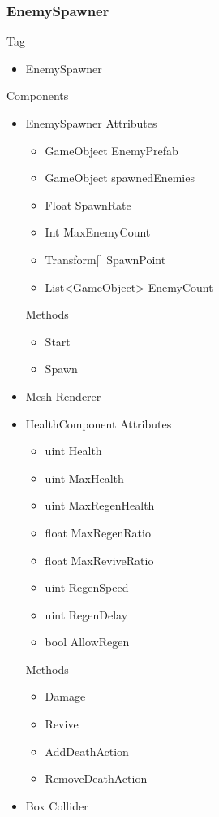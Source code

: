 \documentclass[11pt]{article}
\begin{document}
\subsubsection{EnemySpawner}
Tag
\begin{itemize}
\item EnemySpawner
\end{itemize}
Components
\begin{itemize}
\item EnemySpawner
\newline Attributes
\begin{itemize}
\item GameObject EnemyPrefab
\item GameObject spawnedEnemies
\item Float SpawnRate
\item Int MaxEnemyCount
\item Transform[] SpawnPoint
\item List<GameObject> EnemyCount
\end{itemize}
Methods
\begin{itemize}
\item Start
\item Spawn
\end{itemize}
\item Mesh Renderer
\item HealthComponent
\newline Attributes
\begin{itemize}
\item uint Health
\item uint MaxHealth
\item uint MaxRegenHealth
\item float MaxRegenRatio
\item float MaxReviveRatio
\item uint RegenSpeed
\item uint RegenDelay
\item bool AllowRegen
\end{itemize}
Methods
\begin{itemize}
\item Damage
\item Revive
\item AddDeathAction
\item RemoveDeathAction
\end{itemize}
\item Box Collider
\end{itemize}
\end{document}
